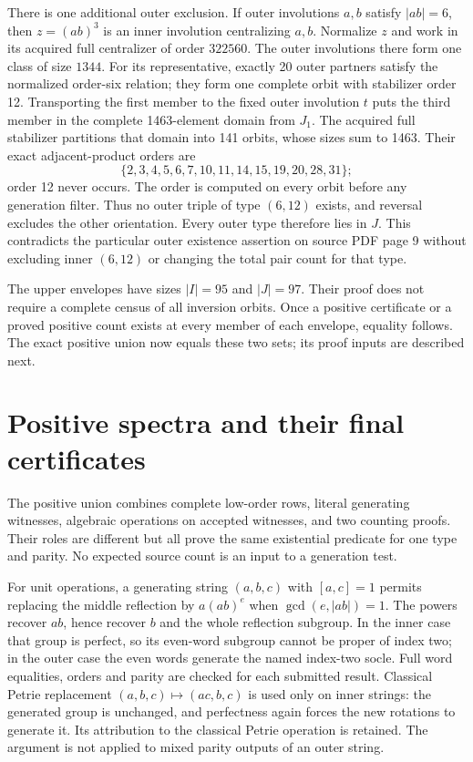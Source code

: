 \documentclass[11pt,a4paper]{article}
\begin{document}
There is one additional outer exclusion. If outer involutions $a,b$
satisfy $|ab|=6$, then $z=(ab)^3$ is an inner involution centralizing
$a,b$. Normalize $z$ and work in its acquired full centralizer of order
$322560$. The outer involutions there form one class of size $1344$.
For its representative, exactly 20 outer partners satisfy the normalized
order-six relation; they form one complete orbit with stabilizer order
12. Transporting the first member to the fixed outer involution $t$
puts the third member in the complete 1463-element domain from $J_1$.
The acquired full stabilizer partitions that domain into 141 orbits,
whose sizes sum to 1463. Their exact adjacent-product orders are
\[
 \{2,3,4,5,6,7,10,11,14,15,19,20,28,31\};
\]
order 12 never occurs. The order is computed on every orbit before any
generation filter. Thus no outer triple of type $(6,12)$ exists, and
reversal excludes the other orientation. Every outer type therefore
lies in $J$. This contradicts the particular outer existence assertion
on source PDF page 9 without excluding inner $(6,12)$ or changing the
total pair count for that type.

The upper envelopes have sizes $|I|=95$ and $|J|=97$. Their proof does
not require a complete census of all inversion orbits. Once a positive
certificate or a proved positive count exists at every member of each
envelope, equality follows. The exact positive union now equals these
two sets; its proof inputs are described next.

\section{Positive spectra and their final certificates}\label{sec:positives}
The positive union combines complete low-order rows, literal generating
witnesses, algebraic operations on accepted witnesses, and two counting
proofs. Their roles are different but all prove the same existential
predicate for one type and parity. No expected source count is an input
to a generation test.

For unit operations, a generating string $(a,b,c)$ with $[a,c]=1$
permits replacing the middle reflection by $a(ab)^e$ when
$\gcd(e,|ab|)=1$. The powers recover $ab$, hence recover $b$ and the
whole reflection subgroup. In the inner case that group is perfect, so
its even-word subgroup cannot be proper of index two; in the outer case
the even words generate the named index-two socle. Full word equalities,
orders and parity are checked for each submitted result. Classical
Petrie replacement $(a,b,c)\mapsto(ac,b,c)$ is used only on inner
strings: the generated group is unchanged, and perfectness again forces
the new rotations to generate it. Its attribution to the classical
Petrie operation is retained. The argument is not applied to mixed
parity outputs of an outer string.
\end{document}
